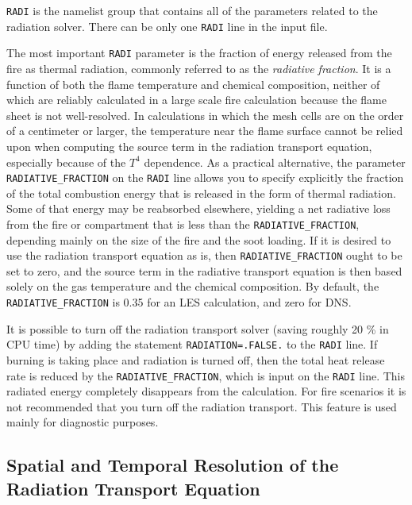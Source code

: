 \documentclass[11pt]{book}
\newcommand{\ct}{\tt\small}
\begin{document}
{\ct RADI} is the namelist group that contains all of the parameters related to the radiation solver. There can be only one
{\ct RADI} line in the input file.

The most important {\ct RADI} parameter is the fraction of energy released from the
fire as thermal radiation, commonly referred to as the {\em radiative fraction}. It is a function of both the flame temperature
and chemical composition, neither of which are reliably calculated in a large
scale fire calculation because the flame sheet is not well-resolved.
In calculations in which the mesh cells are on the order of a centimeter or
larger, the temperature near the flame surface cannot be relied upon when
computing the source term in the radiation transport equation, especially
because of the $T^4$ dependence.
As a practical alternative, the parameter {\ct RADIATIVE\_FRACTION} on the {\ct RADI} line allows you to specify explicitly the
fraction of the total combustion energy that is released in the form of thermal radiation.
Some of that energy may be reabsorbed elsewhere, yielding a net radiative
loss from the fire or compartment that is less than the {\ct RADIATIVE\_FRACTION}, depending mainly on the size of
the fire and the soot loading. If it is desired to use the radiation transport
equation as is, then {\ct RADIATIVE\_FRACTION} ought to be set to zero,
and the source term in the radiative transport equation is then based solely
on the gas temperature and the chemical composition. By default, the {\ct RADIATIVE\_FRACTION} is
0.35 for an LES calculation, and zero for DNS.

It is possible to turn off the radiation transport
solver (saving roughly 20 \% in CPU time) by adding the statement
{\ct RADIATION=.FALSE.} to the {\ct RADI} line.  If burning
is taking place and radiation is turned off, then the total heat
release rate is reduced by the {\ct RADIATIVE\_FRACTION}, which is
input on the {\ct RADI} line. This radiated energy completely
disappears from the calculation. For fire scenarios it is not recommended that you turn off the
radiation transport. This feature is used mainly for diagnostic purposes.



\subsection{Spatial and Temporal Resolution of the Radiation Transport Equation}

\label{info:RADI_Resolution}
\end{document}
